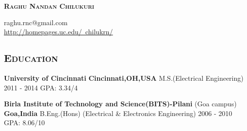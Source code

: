 \documentclass[10pt]{article}
\begin{document}
\begin{center}
 \textbf{ \textsc{\Large Raghu Nandan Chilukuri}}

raghu.rnc@gmail.com
 \\
\href{http://homepages.uc.edu/\~{}chilukrn/}{http://homepages.uc.edu/~chilukrn/}
\end{center}

			       

\subsection*{\textsc{\large Education}}                 
\textbf{University of Cincinnati} \hfill \textbf{Cincinnati,OH,USA} \newline
M.S.(Electrical Engineering) \hfill 2011 - 2014 \newline
GPA: 3.34/4 \newline
     
\noindent \textbf{Birla Institute of Technology and Science(BITS)-Pilani} (Goa campus) \hfill  \textbf{Goa,India} \newline %
B.Eng.(Hons) (Electrical \& Electronics Engineering) \hfill 2006 - 2010 \newline
GPA: 8.06/10 \newline
\end{document}
